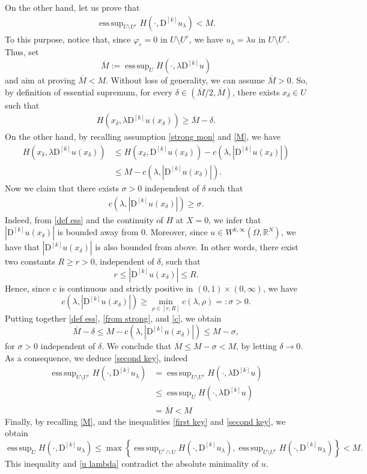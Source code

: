 \documentclass[a4paper,11pt]{article}
\numberwithin{equation}{section}
\newcommand{\numberset}{\mathbb}
\newcommand{\eps}{\varepsilon}
\newcommand{\Om}{\Omega}
\newcommand{\R}{\numberset{R}}
\DeclareMathOperator*{\esssup}{ess\,sup}
\theoremstyle{definition}
\begin{document}
On the other hand, let us prove that
\begin{align}\label{second key}
\esssup_{U\setminus U^\eps}H(\cdot, \mathrm D^{[k]}u_\lambda)<M.
\end{align}
To this purpose, notice that, since $\varphi_\eps=0$ in $U\setminus U^\eps$, we have $u_\lambda=\lambda u$ in $U\setminus U^\eps$. Thus, set $$\overline M:=\esssup_U H(\cdot, \lambda \mathrm D^{[k]}u)$$ and aim at proving $\overline M<M$. Without loss of generality, we can assume $\overline M>0$. So, by definition of essential supremum, for every $\delta\in (\overline M/2,\overline M)$, there exists $x_\delta\in U$ such that
\begin{align}\label{def ess}
 H(x_\delta,\lambda \mathrm{D}^{[k]}u(x_\delta))\geq\overline M-\delta.
\end{align}
On the other hand, by recalling assumption \eqref{strong mon} and \eqref{M}, we have
\begin{align}
 H(x_\delta,\lambda \mathrm{D}^{[k]}u(x_\delta))&\leq H(x_\delta, \mathrm{D}^{[k]}u(x_\delta))-c(\lambda, |\mathrm D^{[k]}u(x_\delta)|)\nonumber\\
&\leq M-c(\lambda, |\mathrm D^{[k]}u(x_\delta)|).\label{from strong}
\end{align}
Now we claim that there exists $\sigma>0$ independent of $\delta$ such that
\begin{align}\label{c}
c(\lambda,|\mathrm D^{[k]}u(x_\delta)|)\geq\sigma.
\end{align}
Indeed, from \eqref{def ess} and the continuity of $H$ at $X=0$, we infer that $|\mathrm D^{[k]}u(x_\delta)|$ is bounded away from $0$. Moreover, since $u\in W^{k,\infty}(\Om,\R^N)$, we have that $|\mathrm D^{[k]}u(x_\delta)|$ is also bounded from above. In other words, there exist two constants $R\geq r>0$, independent of $\delta$, such that
$$
r\leq| \mathrm D^{[k]}u(x_\delta)|\leq R.
$$
Hence, since $c$ is continuous and strictly positive in $(0,1)\times(0,\infty)$, we have $$c(\lambda,| \mathrm D^{[k]}u(x_\delta)|)\geq\min_{\rho\in[r,R]}c(\lambda,\rho)=:\sigma>0.$$
Putting together \eqref{def ess}, \eqref{from strong}, and \eqref{c}, we obtain
$$
\overline M-\delta\leq M-c(\lambda, |\mathrm D^{[k]}u(x_\delta)|)\leq M-\sigma,
$$
for $\sigma>0$ independent of $\delta$. We conclude that $\overline M\leq M-\sigma<M$, by letting $\delta\to 0$.\\
As a consequence, we deduce \eqref{second key}, indeed
\begin{align*}
\esssup_{U\setminus U^\eps}H(\cdot, \mathrm D^{[k]}u_\lambda)&=\esssup_{U\setminus U^\eps}H(\cdot, \lambda\mathrm D^{[k]}u)\\
&\leq \esssup_{U}H(\cdot, \lambda\mathrm D^{[k]}u)\\
&=\overline M<M
\end{align*}
Finally, by recalling \eqref{M}, and the inequalities \eqref{first key} and \eqref{second key}, we obtain
$$
\esssup_{U}H(\cdot, \mathrm D^{[k]}u_\lambda)\leq \max\left\{\esssup_{U^\eps\cap U}H(\cdot, \mathrm D^{[k]}u_\lambda), \esssup_{U\setminus U^\eps}H(\cdot, \mathrm D^{[k]}u_\lambda)\right\}<M.
$$
This inequality and \eqref{u lambda} contradict the absolute minimality of $u$.\\
\end{document}
